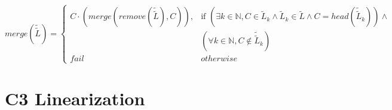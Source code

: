 \documentclass{article}
\begin{document}
\[
merge(\tilde{\tilde{L}}) =
\begin{cases}
C \cdot (merge(remove(\tilde{\tilde{L}}), C)), & \text{if } (\exists k \in \mathbb{N}, C \in \tilde{L}_k \land \tilde{L}_k \in \tilde{L} \land C = head(\tilde{\tilde{L}}_k)) \land \\
& (\forall k \in \mathbb{N}, C \notin \tilde{\tilde{L}}_k ) \\
fail  & otherwise
\end{cases}
\]

\section*{C3 Linearization}
\end{document}
